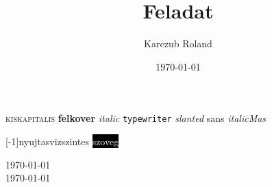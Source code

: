 \documentclass{article}
\begin{document}
\textsc{kiskapitalis}
\textbf{felkover}
\textit{italic}
\texttt {typewriter}
\textsl{slanted}
\textsf{sans}
\emph{\textit{italicMas}}


\scalebox{2}[-1]{nyujtasvizszintes}
\colorbox{black}{\textcolor{white}{szoveg}}


\blindtext
\framebox{\parbox{5cm}{\blindtext}}
\raggedleft{\parbox{5cm}{\blindtext}}
\today\\
\today\\

\title{Feladat}
\author{Karczub Roland}
\date{\today}
\maketitle
\blindtext
\end{document}
